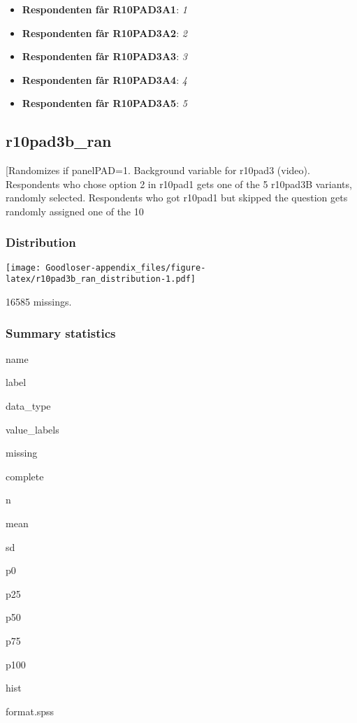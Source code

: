\documentclass[]{book}
\providecommand{\tightlist}{%
  \setlength{\itemsep}{0pt}\setlength{\parskip}{0pt}}
\begin{document}
\begin{itemize}
\tightlist
\item
  \textbf{Respondenten får R10PAD3A1}: \emph{1}
\item
  \textbf{Respondenten får R10PAD3A2}: \emph{2}
\item
  \textbf{Respondenten får R10PAD3A3}: \emph{3}
\item
  \textbf{Respondenten får R10PAD3A4}: \emph{4}
\item
  \textbf{Respondenten får R10PAD3A5}: \emph{5}
\end{itemize}

\subsection{r10pad3b\_ran}\label{r10pad3b_ran}

{[}Randomizes if panelPAD=1. Background variable for r10pad3 (video).
Respondents who chose option 2 in r10pad1 gets one of the 5 r10pad3B
variants, randomly selected. Respondents who got r10pad1 but skipped the
question gets randomly assigned one of the 10

\subsubsection{Distribution}\label{r10pad3b_ran_distribution}

\texttt{[image: Goodloser-appendix\_files/figure-latex/r10pad3b\_ran\_distribution-1.pdf]}

16585 missings.

\subsubsection{Summary statistics}\label{r10pad3b_ran_summary}

name

label

data\_type

value\_labels

missing

complete

n

mean

sd

p0

p25

p50

p75

p100

hist

format.spss
\end{document}
